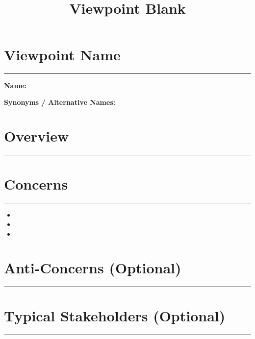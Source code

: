 \documentclass[11pt]{article}
\begin{document}
\title{Viewpoint Blank}
\author{}
\date{}
\maketitle

\section*{Viewpoint Name}
\noindent\rule{0.72\linewidth}{0.4pt}

\vspace{1em}
\noindent
\textbf{Name:} \hrulefill

\vspace{0.5em}
\noindent
\textbf{Synonyms / Alternative Names:}

\vspace{4em}

\section*{Overview}
\noindent\rule{0.72\linewidth}{0.4pt}

\vspace{6em}

\section*{Concerns}
\noindent\rule{0.72\linewidth}{0.4pt}

\vspace{0.5em}
\begin{itemize}[nosep]
  \item
  \item
  \item
\end{itemize}

\vspace{2em}

\section*{Anti-Concerns (Optional)}
\noindent\rule{0.72\linewidth}{0.4pt}

\vspace{4em}

\section*{Typical Stakeholders (Optional)}
\noindent\rule{0.72\linewidth}{0.4pt}
\end{document}

